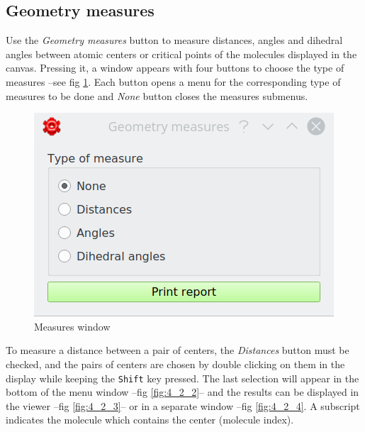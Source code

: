 \documentclass[10pt]{article}
\begin{document}
\subsection{Geometry measures \label{sec:4.2}}

Use the {\it Geometry measures} button to measure distances, angles and dihedral angles between atomic centers or 
critical points of the molecules displayed in the canvas.
Pressing it, a window appears with four buttons to choose the type of measures --see fig \ref{fig:4_2_1}. Each 
button opens a menu for the corresponding type of measures to be done and {\it None} button closes the measures 
submenus.

\begin{figure}[H]
\begin{center}
\includegraphics[width=0.15\linewidth]{damqt320_measures.png}
\end{center}
\caption{{Measures window}\label{fig:4_2_1}}
\end{figure}

To measure a distance between a pair of centers, the {\it Distances}
button must be checked, and the pairs of centers are chosen by double 
clicking on them in the display while keeping the \texttt{Shift} key pressed. 
The last selection will appear in the bottom of the menu window --fig \ref{fig:4_2_2}-- and the results can be 
displayed in the viewer --fig \ref{fig:4_2_3}-- 
or in a separate window --fig \ref{fig:4_2_4}.
A subscript indicates the molecule which contains the center (molecule 
index).

\vspace*{0.5cm}
\end{document}
